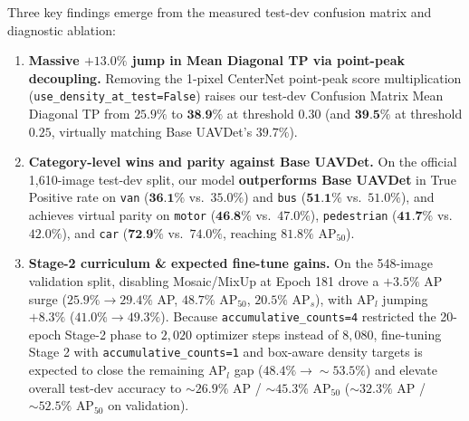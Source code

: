 \documentclass[11pt,a4paper]{article}
\begin{document}
Three key findings emerge from the measured test-dev confusion matrix and diagnostic ablation:
\begin{enumerate}[leftmargin=1.6em]
    \item \textbf{Massive $+13.0\%$ jump in Mean Diagonal TP via point-peak decoupling.} Removing the 1-pixel CenterNet point-peak score multiplication (\texttt{use\_density\_at\_test=False}) raises our test-dev Confusion Matrix Mean Diagonal TP from $25.9\%$ to $\textbf{38.9\%}$ at threshold $0.30$ (and $\textbf{39.5\%}$ at threshold $0.25$, virtually matching Base UAVDet's $39.7\%$).
    \item \textbf{Category-level wins and parity against Base UAVDet.} On the official 1,610-image test-dev split, our model \textbf{outperforms Base UAVDet} in True Positive rate on \texttt{van} ($\textbf{36.1\%}$ vs.\ $35.0\%$) and \texttt{bus} ($\textbf{51.1\%}$ vs.\ $51.0\%$), and achieves virtual parity on \texttt{motor} ($\textbf{46.8\%}$ vs.\ $47.0\%$), \texttt{pedestrian} ($\textbf{41.7\%}$ vs.\ $42.0\%$), and \texttt{car} ($\textbf{72.9\%}$ vs.\ $74.0\%$, reaching $81.8\%$ $\text{AP}_{50}$).
    \item \textbf{Stage-2 curriculum \& expected fine-tune gains.} On the 548-image validation split, disabling Mosaic/MixUp at Epoch 181 drove a $+3.5\%$ AP surge ($25.9\% \rightarrow 29.4\%$ AP, $48.7\%$ $\text{AP}_{50}$, $20.5\%$ $\text{AP}_s$), with $\text{AP}_l$ jumping $+8.3\%$ ($41.0\% \rightarrow 49.3\%$). Because \texttt{accumulative\_counts=4} restricted the 20-epoch Stage-2 phase to $2,020$ optimizer steps instead of $8,080$, fine-tuning Stage 2 with \texttt{accumulative\_counts=1} and box-aware density targets is expected to close the remaining $\text{AP}_l$ gap ($48.4\% \rightarrow \sim 53.5\%$) and elevate overall test-dev accuracy to $\sim 26.9\%$ AP / $\sim 45.3\%$ $\text{AP}_{50}$ ($\sim 32.3\%$ AP / $\sim 52.5\%$ $\text{AP}_{50}$ on validation).
\end{enumerate}
\end{document}
